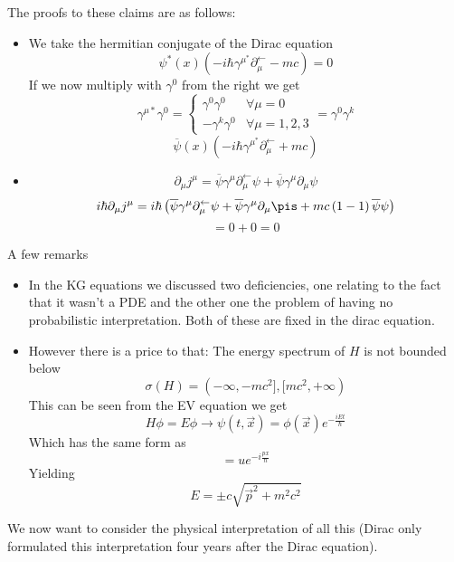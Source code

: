 \documentclass{report}
\begin{document}
The proofs to these claims are as follows:
\begin{itemize}
  \item We take the hermitian conjugate of the Dirac equation \[
      \psi^*\left( x \right) \left( - i \hbar \gamma^\mu^* \partial_\mu^{\leftarrow} - mc   \right) =0
  \] If we now multiply with $\gamma^0$ from the right we get \[
  \gamma^{\mu*} \gamma^0 = \begin{cases}
    \gamma^0 \gamma^0 & \forall \mu = 0 \\
    -\gamma^k \gamma^0 & \forall \mu = 1,2,3
  \end{cases} = \gamma^0 \gamma^k
  \]  \[
  \overline{\psi}\left( x \right) \left( -i\hbar \gamma^\mu^* \partial^\leftarrow_\mu + mc  \right) 
  \] 
\item \[
\partial_\mu j^\mu = \overline{\psi} \gamma^\mu \partial^\leftarrow_\mu \psi + \overline{\psi} \gamma^\mu \partial_\mu \psi   
\] \[
i \hbar \partial_\mu j^\mu = i\hbar \left( \overline{\psi} \gamma^\mu \partial^\leftarrow_\mu \psi + \overline{\psi} \gamma^\mu \partial_\mu \pis + mc\left( 1-1 \right) \overline{\psi}\psi   \right)  
\] \[
= 0+ 0 = 0
\] 
\end{itemize}
A few remarks
\begin{itemize}
  \item In the KG equations we discussed two deficiencies, one relating to the fact that it wasn't a PDE and the other one the problem of having no probabilistic interpretation. Both of these are fixed in the dirac equation.
  \item However there is a price to that: The energy spectrum of $H$ is not bounded below \[
      \sigma(H) = (-\infty, -mc^2], [mc^2, +\infty)
  \] This can be seen from the EV equation we get \[
  H\phi = E \phi \to \psi\left( t,\vec{x} \right) = \phi\left( \vec{x} \right) e^{- \frac{iEt}{\hbar}}
  \] Which has the same form as \[
  = u e^{-i \frac{px}{\hbar}}
  \] Yielding \[
  E = \pm c \sqrt{\vec{p}^2 + m^2 c^2} 
  \] 
\end{itemize}
We now want to consider the physical interpretation of all this (Dirac only formulated this interpretation four years after the Dirac equation).
\end{document}

